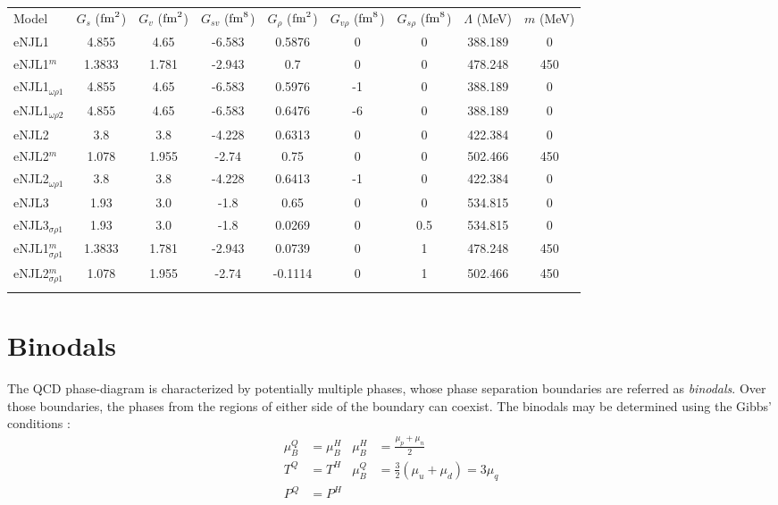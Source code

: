 \documentclass{ws-ijmpcs}
\begin{document}
\begin{table}[ph]
{\begin{tabular}{@{}lcccccccc@{}}\toprule
Model & $G_s$ ($\rm{fm}^2$) & $G_v$ ($\rm{fm}^2$) & $G_{sv}$ ($\rm{fm}^8$) & $G_\rho$ ($\rm{fm}^2$) & $G_{v\rho}$ ($\rm{fm}^8$) & $G_{s\rho}$ ($\rm{fm}^8$) & $\Lambda$ (MeV) & $m$ (MeV) \\ \colrule
eNJL1 & 4.855 & 4.65 & -6.583 & 0.5876 & 0 & 0 & 388.189 & 0 \\
eNJL1$^m$ & 1.3833 & 1.781 & -2.943 & 0.7 & 0 & 0 & 478.248 & 450 \\
eNJL1$_{\omega\rho 1}$ & 4.855 & 4.65 & -6.583 & 0.5976 & -1 & 0 & 388.189 & 0 \\
eNJL1$_{\omega\rho 2}$ & 4.855 & 4.65 & -6.583 & 0.6476 & -6 & 0 & 388.189 & 0 \\
eNJL2 & 3.8 & 3.8 & -4.228 & 0.6313 & 0 & 0 & 422.384 & 0 \\
eNJL2$^m$ & 1.078 & 1.955 & -2.74 & 0.75 & 0 & 0 & 502.466 & 450 \\
eNJL2$_{\omega\rho 1}$ & 3.8 & 3.8 & -4.228 & 0.6413 & -1 & 0 & 422.384 & 0 \\
eNJL3 & 1.93 & 3.0 & -1.8 & 0.65 & 0 & 0 & 534.815 & 0 \\
eNJL3$_{\sigma\rho 1}$ & 1.93 & 3.0 & -1.8 & 0.0269 & 0 & 0.5 & 534.815 & 0 \\
eNJL1$^m_{\sigma\rho 1}$ & 1.3833 & 1.781 & -2.943 & 0.0739 & 0 & 1 & 478.248 & 450 \\
eNJL2$^m_{\sigma\rho 1}$ & 1.078 & 1.955 & -2.74 & -0.1114 & 0 & 1 & 502.466 & 450 \\
\botrule
\end{tabular}\label{Tab:Parametros_eNJL}}
\end{table}


\section{Binodals}

The QCD phase-diagram is characterized by potentially multiple phases, whose phase separation boundaries are referred as \emph{binodals}. Over those boundaries, the phases from the regions of either side of the boundary can coexist. The binodals may be determined using the Gibbs' conditions \cite{Cavagnoli2011}:
\begin{align*}
\mu_B^Q &= \mu_B^H &	\mu_B^H &= \frac{\mu_p + \mu_n}{2} \\
T^Q &= T^H & 	\mu_B^Q &= \frac{3}{2} (\mu_u + \mu_d) = 3 \mu_q\\
P^Q &= P^H
\end{align*}
\end{document}

